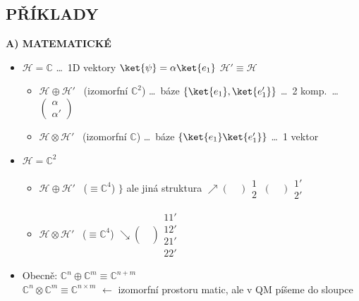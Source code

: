 \documentclass[11pt,a4paper]{article}
\begin{document}
\subsection*{PŘÍKLADY}
\textbf{A) MATEMATICKÉ}
\begin{itemize}
  \item $\mathcal{H} = \mathbb{C}$ \quad \dots\ 1D vektory \quad $\ket{\psi} = \alpha\ket{e_1}$ \hfill $\mathcal{H}'\equiv\mathcal{H}$
  \begin{itemize}[nosep]
    \item[--] $\mathcal{H}\oplus\mathcal{H}'$ \ (izomorfní $\mathbb{C}^2$) \quad \dots\ báze $\{\ket{e_1},\ket{e_1'}\}$ \dots\ 2 komp.\ \dots\ $\begin{pmatrix}\alpha\\ \alpha'\end{pmatrix}$
    \item[--] $\mathcal{H}\otimes\mathcal{H}'$ \ (izomorfní $\mathbb{C}$) \quad \dots\ báze $\{\ket{e_1}\ket{e_1'}\}$ \dots\ 1 vektor
  \end{itemize}
  \item $\mathcal{H} = \mathbb{C}^2$
  \begin{itemize}[nosep]
    \item[--] $\mathcal{H}\oplus\mathcal{H}'$ \ ($\equiv\mathbb{C}^4$) \quad $\Big\}$ ale jiná struktura \quad
          $\nearrow \begin{pmatrix}\ \\ \ \end{pmatrix}\!\begin{smallmatrix}1\\2\end{smallmatrix}\
                    \begin{pmatrix}\ \\ \ \end{pmatrix}\!\begin{smallmatrix}1'\\2'\end{smallmatrix}$
    \item[--] $\mathcal{H}\otimes\mathcal{H}'$ \ ($\equiv\mathbb{C}^4$) \hspace{3.7cm}
          $\searrow \begin{pmatrix}\ \\ \ \\ \ \\ \ \end{pmatrix}\!\begin{smallmatrix}11'\\12'\\21'\\22'\end{smallmatrix}$
  \end{itemize}
  \item Obecně: \quad $\mathbb{C}^n\oplus\mathbb{C}^m \equiv \mathbb{C}^{n+m}$ \\
        \phantom{Obecně:} \quad $\mathbb{C}^n\otimes\mathbb{C}^m \equiv \mathbb{C}^{n\times m}$ \quad
        $\leftarrow$ izomorfní prostoru matic, ale v QM píšeme do sloupce
\end{itemize}
\end{document}
